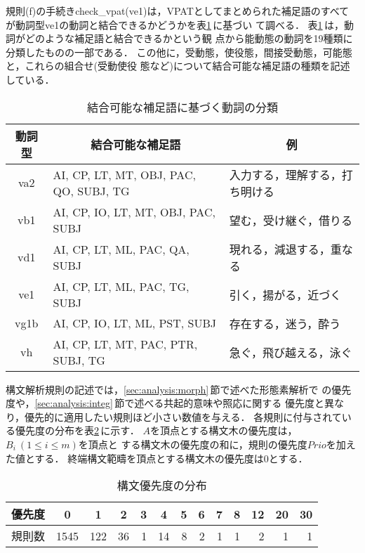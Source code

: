 規則(f)の手続きcheck\_vpat(ve1)は，VPATとしてまとめられた補足語のすべて
が動詞型ve1の動詞と結合できるかどうかを表\ref{tab:verb_type}\,に基づい
て調べる．
表\ref{tab:verb_type}\,は，動詞がどのような補足語と結合できるかという観
点から能動態の動詞を19種類に分類したものの一部である．
この他に，受動態，使役態，間接受動態，可能態と，これらの組合せ(受動使役
態など)について結合可能な補足語の種類を記述している．
\begin{table}[tbhp]
\caption{結合可能な補足語に基づく動詞の分類}
\label{tab:verb_type}
\begin{center}
\begin{tabular}{|c||l|l|}\hline
\multicolumn{1}{|c||}{動詞型}&\multicolumn{1}{c|}{結合可能な補足語}&
\multicolumn{1}{c|}{例}\\\hline\hline
va2  & AI, CP, LT, MT, OBJ, PAC, QO, SUBJ, TG	& 入力する，理解する，打ち明ける\\
vb1  & AI, CP, IO, LT, MT, OBJ, PAC, SUBJ	& 望む，受け継ぐ，借りる\\
vd1  & AI, CP, LT, ML, PAC, QA, SUBJ		& 現れる，減退する，重なる\\
ve1  & AI, CP, LT, ML, PAC, TG, SUBJ            & 引く，揚がる，近づく\\
vg1b & AI, CP, IO, LT, ML, PST, SUBJ            & 存在する，迷う，酔う\\
vh   & AI, CP, LT, MT, PAC, PTR, SUBJ, TG	& 急ぐ，飛び越える，泳ぐ\\\hline
\end{tabular}
\end{center}
\end{table}

構文解析規則の記述では，\ref{sec:analysis:morph}\,節で述べた形態素解析で
の優先度や，\ref{sec:analysis:integ}\,節で述べる共起的意味や照応に関する
優先度と異なり，優先的に適用したい規則ほど小さい数値を与える．
各規則に付与されている優先度の分布を表\ref{tab:syn_pref_distr}\,に示す．
$A$を頂点とする構文木の優先度は，$B_i\ (1 \le i \le m)$を頂点と
する構文木の優先度の和に，規則の優先度$Prio$を加えた値とする．
終端構文範疇を頂点とする構文木の優先度は0とする．
\begin{table}[tbhp]
\caption{構文優先度の分布}
\label{tab:syn_pref_distr}
\begin{center}
\begin{tabular}{|c||r|r|r|r|r|r|r|r|r|r|r|r|}\hline
優先度&
\multicolumn{1}{|c}{0}&\multicolumn{1}{|c}{1}&\multicolumn{1}{|c}{2}&
\multicolumn{1}{|c}{3}&\multicolumn{1}{|c}{4}&\multicolumn{1}{|c}{5}&
\multicolumn{1}{|c}{6}&\multicolumn{1}{|c}{7}&\multicolumn{1}{|c}{8}&
\multicolumn{1}{|c}{12}&\multicolumn{1}{|c}{20}&\multicolumn{1}{|c|}{30}\\\hline
規則数&1545 & 122 & 36 & 1 & 14 & 8 & 2 & 1 & 1 & 2 & 1 & 1 \\\hline
\end{tabular}
\end{center}
\end{table}

